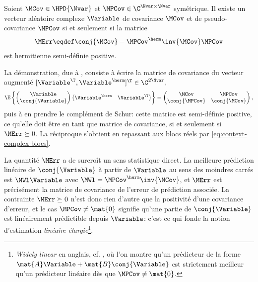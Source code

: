 \begin{proposition}
\label{prop:context-complex-picinbono}
  Soient $\MCov\in\HPD{\Nvar}$ et $\MPCov\in\C^{\Nvar\times\Nvar}$ symétrique. Il existe un vecteur aléatoire complexe $\Variable$ de covariance $\MCov$ et de pseudo-covariance $\MPCov$ si et seulement si la matrice
\begin{equation}
  \MErr \eqdef \conj{\MCov} - \MPCov^\herm\inv{\MCov}\MPCov
  \label{eq:context-complex-picinbono}
\end{equation}
  est hermitienne semi-définie positive.
\end{proposition}

\begin{remark}
  La démonstration, due à , consiste à écrire la matrice de covariance du vecteur augmenté $[\Variable^\T,\Variable^\herm]^\T\in\C^{2\Nvar}$,
  $$
  \E\left\{
  \begin{pmatrix}\Variable\\\conj{\Variable}\end{pmatrix}
  \begin{pmatrix}\Variable^\herm & \Variable^\T\end{pmatrix}
  \right\}
  =
  \begin{pmatrix}
    \MCov & \MPCov \\
    \conj{\MPCov} & \conj{\MCov}
  \end{pmatrix},
  $$
  puis à en prendre le complément de Schur: cette matrice est semi-définie positive, ce qu'elle doit être en tant que matrice de covariance, si et seulement si $\MErr\succeq 0$. La réciproque s'obtient en repassant aux blocs réels par \cref{eq:context-complex-blocs}.

  La quantité $\MErr$ a de surcroît un sens statistique direct. La meilleure prédiction linéaire de $\conj{\Variable}$ à partir de $\Variable$ au sens des moindres carrés est $\MWl\Variable$ avec $\MWl = \MPCov^\herm\inv{\MCov}$, et $\MErr$ est précisément la matrice de covariance de l'erreur de prédiction associée. La contrainte $\MErr\succeq 0$ n'est donc rien d'autre que la positivité d'une covariance d'erreur, et le cas $\MPCov\neq\mat{0}$ signifie qu'une partie de $\conj{\Variable}$ est linéairement prédictible depuis $\Variable$: c'est ce qui fonde la notion d'estimation \emph{linéaire élargie}\footnote{\emph{Widely linear} en anglais, cf. \cite{PicinbonoChevalier1995}, où l'on montre qu'un prédicteur de la forme $\mat{A}\Variable + \mat{B}\conj{\Variable}$ est strictement meilleur qu'un prédicteur linéaire dès que $\MPCov\neq\mat{0}$.}.
\end{remark}

